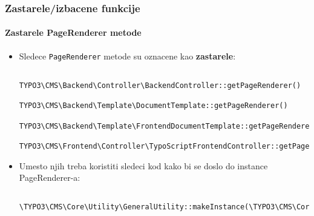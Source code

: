 \begin{frame}[fragile]
\begin{itemize}
	\end{itemize}

\end{frame}


\begin{frame}[fragile]
	\frametitle{Zastarele/izbacene funkcije}
	\framesubtitle{Zastarele PageRenderer metode}

	\lstset{basicstyle=\tiny\ttfamily}

	\begin{itemize}
		\item Sledece \texttt{PageRenderer} metode su oznacene kao \textbf{zastarele}:

			\begin{lstlisting}
				TYPO3\CMS\Backend\Controller\BackendController::getPageRenderer()
				TYPO3\CMS\Backend\Template\DocumentTemplate::getPageRenderer()
				TYPO3\CMS\Backend\Template\FrontendDocumentTemplate::getPageRenderer()
				TYPO3\CMS\Frontend\Controller\TypoScriptFrontendController::getPageRenderer()
			\end{lstlisting}

		\item Umesto njih treba koristiti sledeci kod kako bi se doslo do instance PageRenderer-a:

			\begin{lstlisting}
				\TYPO3\CMS\Core\Utility\GeneralUtility::makeInstance(\TYPO3\CMS\Core\Page\PageRenderer::class)
			\end{lstlisting}

	\end{itemize}

\end{frame}


